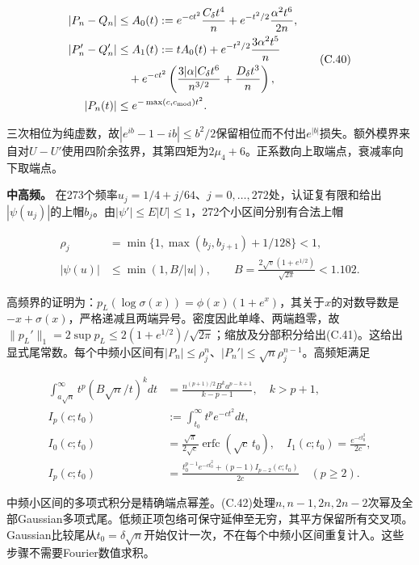 \documentclass[11pt,a4paper]{article}
\begin{document}
\[
\begin{aligned}
|P_n-Q_n|&\le A_0(t):=e^{-ct^2}\frac{C_\delta t^4}{n}
+e^{-t^2/2}\frac{\alpha^2t^6}{2n},\\
|P_n'-Q_n'|&\le A_1(t):=tA_0(t)+e^{-t^2/2}\frac{3\alpha^2t^5}{n}\\
&\quad+e^{-ct^2}\left(\frac{3|\alpha|C_\delta t^6}{n^{3/2}}
+\frac{D_\delta t^3}{n}\right),\\
|P_n(t)|&\le e^{-\max(c,c_{\rm mod})t^2}.
\end{aligned}
\tag{C.40}
\]

三次相位为纯虚数，故\(|e^{ib}-1-ib|\le b^2/2\)保留相位而不付出\(e^{|b|}\)损失。额外模界来自对\(U-U'\)使用四阶余弦界，其第四矩为\(2\mu_4+6\)。正系数向上取端点，衰减率向下取端点。

\textbf{中高频。}
在273个频率\(u_j=1/4+j/64\)、\(j=0,\ldots,272\)处，认证复有限和给出\(|\psi(u_j)|\)的上帽\(b_j\)。由\(|\psi'|\le E|U|\le1\)，272个小区间分别有合法上帽

\[
\begin{aligned}
\rho_j&=\min\{1,\max(b_j,b_{j+1})+1/128\}<1,\\
|\psi(u)|&\le \min(1,B/|u|),\qquad
B=\frac{2\sqrt v(1+e^{1/2})}{\sqrt{2\pi}}<1.102.
\end{aligned}
\tag{C.41}
\]

高频界的证明为：\(p_L(\log\sigma(x))=\phi(x)(1+e^x)\)，其关于\(x\)的对数导数是\(-x+\sigma(x)\)，严格递减且两端异号。密度因此单峰、两端趋零，故\(\|p_L'\|_1=2\sup p_L\le2(1+e^{1/2})/\sqrt{2\pi}\)；缩放及分部积分给出(C.41)。这给出显式尾常数。每个中频小区间有\(|P_n|\le\rho_j^n\)、\(|P_n'|\le\sqrt n\rho_j^{n-1}\)。高频矩满足

\[
\begin{aligned}
\int_{a\sqrt n}^{\infty}t^p(B\sqrt n/t)^kdt
&=\frac{n^{(p+1)/2}B^ka^{p-k+1}}{k-p-1},\quad k>p+1,\\
I_p(c;t_0)&:=\int_{t_0}^{\infty}t^pe^{-ct^2}dt,\\
I_0(c;t_0)&=\frac{\sqrt\pi}{2\sqrt c}\operatorname{erfc}(\sqrt c\,t_0),
\quad I_1(c;t_0)=\frac{e^{-ct_0^2}}{2c},\\
I_p(c;t_0)&=\frac{t_0^{p-1}e^{-ct_0^2}+(p-1)I_{p-2}(c;t_0)}{2c}\quad(p\ge2).
\end{aligned}
\tag{C.42}
\]

中频小区间的多项式积分是精确端点幂差。(C.42)处理\(n,n-1,2n,2n-2\)次幂及全部Gaussian多项式尾。低频正项包络可保守延伸至无穷，其平方保留所有交叉项。Gaussian比较尾从\(t_0=\delta\sqrt n\)开始仅计一次，不在每个中频小区间重复计入。这些步骤不需要Fourier数值求积。
\end{document}
